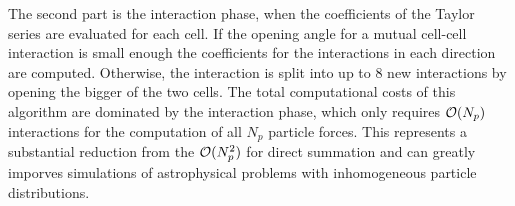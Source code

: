 The second part is the interaction phase, when the coefficients of the Taylor series are evaluated for each cell. If the opening angle for a mutual cell-cell interaction is small enough the coefficients for the interactions in each direction are computed.  Otherwise, the interaction is split into up to 8 new interactions by opening the bigger of the two cells. The total computational
costs of this algorithm are dominated by the interaction phase, which only requires $\mathcal{O}(N_p)$ interactions for the computation of all $N_p$ particle forces. This represents a substantial reduction from the $\mathcal{O}(N_p^2)$ for direct summation and can greatly imporves simulations of astrophysical problems with inhomogeneous particle distributions.
